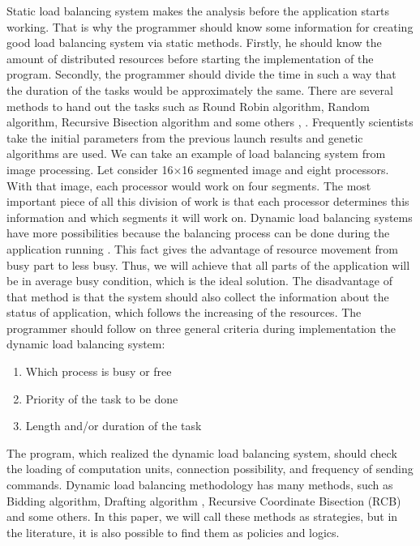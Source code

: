 Static load balancing system makes the analysis before the application starts working. That is why the programmer should know some information for creating good load balancing system via static methods. Firstly, he should know the amount of distributed resources before starting the implementation of the program. Secondly, the programmer should divide the time in such a way that the duration of the tasks would be approximately the same. There are several methods to hand out the tasks such as Round Robin algorithm, Random algorithm, Recursive Bisection algorithm and some others \cite{oper_sys_conc}, \cite{perf_dlba}. Frequently scientists take the initial parameters from the previous launch results and genetic algorithms are used. We can take an example of load balancing system from image processing. Let consider 16$\times$16 segmented image and eight processors. With that image, each processor would work on four segments. The most important piece of all this division of work is that each processor determines this information and which segments it will work on.
\newpage
Dynamic load balancing systems have more possibilities because the balancing process can be done during the application running \cite{guide_dyn_bal}. This fact gives the advantage of resource movement from busy part to less busy. Thus, we will achieve that all parts of the application will be in average busy condition, which is the ideal solution. The disadvantage of that method is that the system should also collect the information about the status of application, which follows the increasing of the resources. The programmer should follow on three general criteria during implementation the dynamic load balancing system:
\begin{enumerate}%
	\setlength{\itemsep}{-2mm}
	\item Which process is busy or free 
	\item Priority of the task to be done 
	\item Length and/or duration of the task
\end{enumerate}
The program, which realized the dynamic load balancing system, should check the loading of computation units, connection possibility, and frequency of sending commands. Dynamic load balancing methodology has many methods, such as Bidding algorithm, Drafting algorithm \cite{draft_alg}, Recursive Coordinate Bisection (RCB) and some others. In this paper, we will call these methods as strategies, but in the literature, it is also possible to find them as policies and logics.

